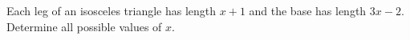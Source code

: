 Each leg of an isosceles triangle has length $x+1$ and the base has length $3x-2$. Determine all possible values of $x$.
